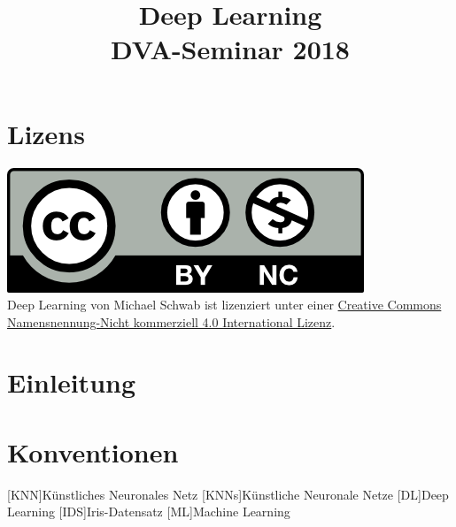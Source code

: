 \documentclass[conference, german]{IEEEtran}
\begin{document}
\title{Deep Learning\\
{\footnotesize DVA-Seminar 2018}
}
\author{
}

\maketitle
\renewcommand{\abstractname}{Zusammenfassung}



\begin{abstract}
\end{abstract}

\section*{Lizens}
\href{http://creativecommons.org/licenses/by-nc/4.0/}{\includegraphics{img/by-nc.png}}\\
{Deep Learning} von {Michael Schwab} ist lizenziert unter einer
\href{http://creativecommons.org/licenses/by-nc/4.0/}{Creative Commons
	Namensnennung-Nicht kommerziell 4.0 International Lizenz}.
\section{Einleitung} 
\section{Konventionen}
\begin{acronym}
	[KNN]{Künstliches Neuronales Netz}
	[KNNs]{Künstliche Neuronale Netze}
	[DL]{Deep Learning}
	[IDS]{Iris-Datensatz}
	[ML]{Machine Learning}
\end{acronym}
\end{document}
